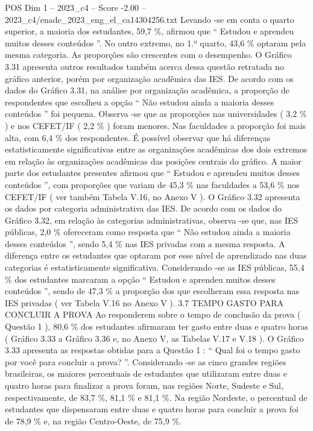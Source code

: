 \begin{textsample}{POS Dim 1 – 2023\_c4 – Score -2.00 – 2023\_c4/enade\_2023\_eng\_el\_ca14304256.txt}
Levando -se em conta o quarto superior, a maioria dos estudantes, 59,7 \%, afirmou que “ Estudou e aprendeu muitos desses conteúdos ”.
No outro extremo, no 1.º quarto, 43,6 \% optaram pela mesma categoria.
As proporções são crescentes com o desempenho.
O Gráfico 3.31 apresenta outros resultados também acerca dessa questão retratada no gráfico anterior, porém por organização acadêmica das IES.
De acordo com os dados do Gráfico 3.31, na análise por organização acadêmica, a proporção de respondentes que escolheu a opção “ Não estudou ainda a maioria desses conteúdos ” foi pequena.
Observa -se que as proporções nas universidades ( 3,2 \% ) e nos CEFET/IF ( 2,2 \% ) foram menores.
Nas faculdades a proporção foi mais alta, com 6,4 \% dos respondentes.
É possível observar que há diferenças estatisticamente significativas entre as organizações acadêmicas dos dois extremos em relação às organizações acadêmicas das posições centrais do gráfico.
A maior parte dos estudantes presentes afirmou que “ Estudou e aprendeu muitos desses conteúdos ”, com proporções que variam de 45,3 \% nas faculdades a 53,6 \% nos CEFET/IF ( ver também Tabela V.16, no Anexo V ).
O Gráfico 3.32 apresenta os dados por categoria administrativa das IES.
De acordo com os dados do Gráfico 3.32, em relação às categorias administrativas, observa -se que, nas IES públicas, 2,0 \% ofereceram como resposta que “ Não estudou ainda a maioria desses conteúdos ”, sendo 5,4 \% nas IES privadas com a mesma resposta.
A diferença entre os estudantes que optaram por esse nível de aprendizado nas duas categorias é estatisticamente significativa.
Considerando -se as IES públicas, 55,4 \% dos estudantes marcaram a opção “ Estudou e aprendeu muitos desses conteúdos ”, sendo de 47,3 \% a proporção dos que escolheram essa resposta nas IES privadas ( ver Tabela V.16 no Anexo V ). 3.7 TEMPO GASTO PARA CONCLUIR A PROVA Ao responderem sobre o tempo de conclusão da prova ( Questão 1 ), 80,6 \% dos estudantes afirmaram ter gasto entre duas e quatro horas ( Gráfico 3.33 a Gráfico 3.36 e, no Anexo V, as Tabelas V.17 e V.18 ).
O Gráfico 3.33 apresenta as respostas obtidas para a Questão 1 : “ Qual foi o tempo gasto por você para concluir a prova? ”.
Considerando -se as cinco grandes regiões brasileiras, os maiores percentuais de estudantes que utilizaram entre duas e quatro horas para finalizar a prova foram, nas regiões Norte, Sudeste e Sul, respectivamente, de 83,7 \%, 81,1 \% e 81,1 \%.
Na região Nordeste, o percentual de estudantes que dispensaram entre duas e quatro horas para concluir a prova foi de 78,9 \% e, na região Centro-Oeste, de 75,9 \%.

\end{textsample}
